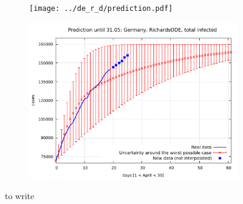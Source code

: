 \documentclass[8pt]{article}
\begin{document}
\begin{figure}[h!]
  \centering
  \begin{subfigure}[b]{0.48\linewidth}
  \texttt{[image: ../de\_r\_d/prediction.pdf]}
  \end{subfigure}
  \begin{subfigure}[b]{0.48\linewidth}
    \includegraphics[width=\linewidth]{../de_r_t/prediction.pdf}
  \end{subfigure}
	\caption{to write}
\end{figure}
\end{document}
